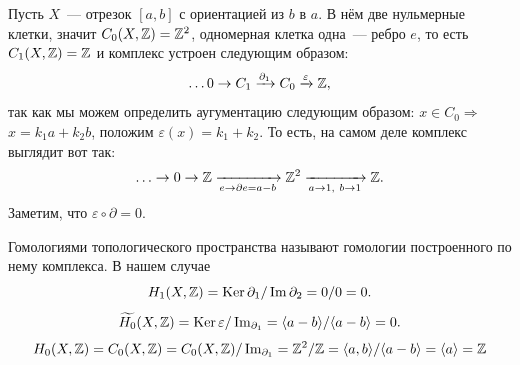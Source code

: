     \begin{example}

        Пусть $X$~--- отрезок $[a, b]$ с ориентацией из $b$ в $a$. В нём две нульмерные клетки, значит $C_0(X, \mathbb{Z}) = \mathbb{Z}^2$, одномерная клетка одна~--- ребро $e$, то есть $C_{1}(X, \mathbb{Z}) = \mathbb{Z}$
        и комплекс устроен следующим образом:
        \[ \ldots 0 \to  C_{1} \xrightarrow{\partial_{1}} C_{0} \xrightarrow{\varepsilon} \mathbb{Z}, \]
        так как мы можем определить аугументацию следующим образом: $x \in C_0 \Rightarrow$ $x = k_1 a + k_2 b$, положим $\varepsilon(x) = k_1 + k_2$.
        То есть, на самом деле комплекс выглядит вот так:
        \[ \ldots \to 0 \to \mathbb{Z} \xrightarrow[e \to \partial e = a - b]{} \mathbb{Z}^{2} \xrightarrow[a \to 1, \ b \to 1]{} \mathbb{Z}.\]
        Заметим, что $\varepsilon \circ \partial = 0$.

        Гомологиями топологического пространства называют гомологии построенного по нему комплекса. В нашем случае
        \[ H_{1}(X, \mathbb{Z}) = \operatorname{Ker}{\partial_{1}}/\mathop{\mathrm{Im}}\nolimits{\partial_{2}} = 0/0 = 0. \]
        \[ \widetilde{H_{0}}(X, \mathbb{Z}) = \operatorname{Ker}{\varepsilon} / \mathop{\mathrm{Im}}\nolimits_{\partial_{1}} = \langle a - b \rangle / \langle a - b \rangle = 0. \]
        \[ H_{0}(X, \mathbb{Z}) = C_0(X, \mathbb{Z}) = C_{0}(X, \mathbb{Z})/\mathop{\mathrm{Im}}\nolimits_{\partial_{1}} = \mathbb{Z}^2 / \mathbb{Z} = \langle a, b \rangle / \langle a - b \rangle = \langle a \rangle = \mathbb{Z}\]
    \end{example}

